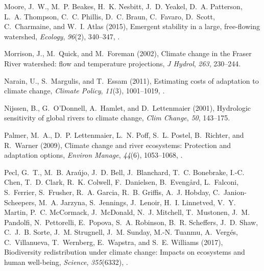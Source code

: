 \documentclass[draft,linenumbers]{AGUJournal}
\begin{document}
\begin{thebibliography}{38}
Moore, J.~W., M.~P. Beakes, H.~K. Nesbitt, J.~D. Yeakel, D.~A. Patterson, L.~A.
  Thompson, C.~C. Phillis, D.~C. Braun, C.~Favaro, D.~Scott, C.~Charmaine, and
  W.~I. Atlas (2015), Emergent stability in a large, free{-}flowing watershed,
  \textit{Ecology}, \textit{96}(2), 340--347,
  .

Morrison, J., M.~Quick, and M.~Foreman (2002), Climate change in the {Fraser
  River} watershed: flow and temperature projections, \textit{J Hydrol},
  \textit{263}, 230--244.

Narain, U., S.~Margulis, and T.~Essam (2011), Estimating costs of adaptation to
  climate change, \textit{Climate Policy}, \textit{11}(3), 1001--1019,
  .

Nijssen, B., G.~{O'Donnell}, A.~Hamlet, and D.~Lettenmaier (2001), Hydrologic
  sensitivity of global rivers to climate change, \textit{Clim Change},
  \textit{50}, 143--175.

Palmer, M.~A., D.~P. Lettenmaier, L.~N. Poff, S.~L. Postel, B.~Richter, and
  R.~Warner (2009), Climate change and river ecosystems: Protection and
  adaptation options, \textit{Environ Manage}, \textit{44}(6), 1053--1068,
  .

Pecl, G.~T., M.~B. Ara{\'u}jo, J.~D. Bell, J.~Blanchard, T.~C. Bonebrake, I.-C.
  Chen, T.~D. Clark, R.~K. Colwell, F.~Danielsen, B.~Eveng{\aa}rd, L.~Falconi,
  S.~Ferrier, S.~Frusher, R.~A. Garcia, R.~B. Griffis, A.~J. Hobday,
  C.~Janion-Scheepers, M.~A. Jarzyna, S.~Jennings, J.~Lenoir, H.~I. Linnetved,
  V.~Y. Martin, P.~C. McCormack, J.~McDonald, N.~J. Mitchell, T.~Mustonen,
  J.~M. Pandolfi, N.~Pettorelli, E.~Popova, S.~A. Robinson, B.~R. Scheffers,
  J.~D. Shaw, C.~J.~B. Sorte, J.~M. Strugnell, J.~M. Sunday, M.-N. Tuanmu,
  A.~Verg{\'e}s, C.~Villanueva, T.~Wernberg, E.~Wapstra, and S.~E. Williams
  (2017), Biodiversity redistribution under climate change: Impacts on
  ecosystems and human well-being, \textit{Science}, \textit{355}(6332),
  .


\end{thebibliography}
\end{document}
